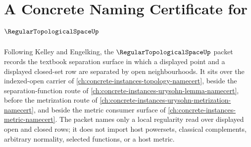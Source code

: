 \chapter{A Concrete Naming Certificate for $\RegularTopologicalSpaceUp$}
\label{ch:concrete-instances-regular-topological-space-namecert}

Following Kelley and Engelking, the $\RegularTopologicalSpaceUp$ packet records the textbook separation surface in which a displayed point and a displayed closed-set row are separated by open neighbourhoods. It sits over the indexed-open carrier of \autoref{ch:concrete-instances-topology-namecert}, beside the separation-function route of \autoref{ch:concrete-instances-urysohn-lemma-namecert}, before the metrization route of \autoref{ch:concrete-instances-urysohn-metrization-namecert}, and beside the metric consumer surface of \autoref{ch:concrete-instances-metric-namecert}. The packet names only a local regularity read over displayed open and closed rows; it does not import host powersets, classical complements, arbitrary normality, selected functions, or a host metric.

